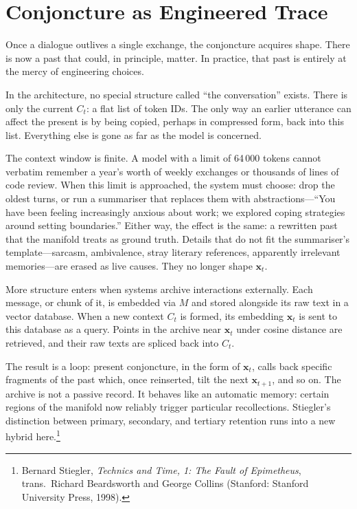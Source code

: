 \documentclass[12pt,a4paper]{article}
\begin{document}
\section{Conjoncture as Engineered Trace}

Once a dialogue outlives a single exchange, the conjoncture acquires shape. There is now a past that could, in principle, matter. In practice, that past is entirely at the mercy of engineering choices.

In the architecture, no special structure called ``the conversation'' exists. There is only the current $C_t$: a flat list of token IDs. The only way an earlier utterance can affect the present is by being copied, perhaps in compressed form, back into this list. Everything else is gone as far as the model is concerned.

The context window is finite. A model with a limit of 64\,000 tokens cannot verbatim remember a year's worth of weekly exchanges or thousands of lines of code review. When this limit is approached, the system must choose: drop the oldest turns, or run a summariser that replaces them with abstractions---``You have been feeling increasingly anxious about work; we explored coping strategies around setting boundaries.'' Either way, the effect is the same: a rewritten past that the manifold treats as ground truth. Details that do not fit the summariser's template---sarcasm, ambivalence, stray literary references, apparently irrelevant memories---are erased as live causes. They no longer shape $\mathbf{x}_t$.

More structure enters when systems archive interactions externally. Each message, or chunk of it, is embedded via $M$ and stored alongside its raw text in a vector database. When a new context $C_t$ is formed, its embedding $\mathbf{x}_t$ is sent to this database as a query. Points in the archive near $\mathbf{x}_t$ under cosine distance are retrieved, and their raw texts are spliced back into $C_t$.

The result is a loop: present conjoncture, in the form of $\mathbf{x}_t$, calls back specific fragments of the past which, once reinserted, tilt the next $\mathbf{x}_{t+1}$, and so on. The archive is not a passive record. It behaves like an automatic memory: certain regions of the manifold now reliably trigger particular recollections. Stiegler's distinction between primary, secondary, and tertiary retention runs into a new hybrid here.\footnote{Bernard Stiegler, \emph{Technics and Time, 1: The Fault of Epimetheus}, trans.\ Richard Beardsworth and George Collins (Stanford: Stanford University Press, 1998).}
\end{document}
